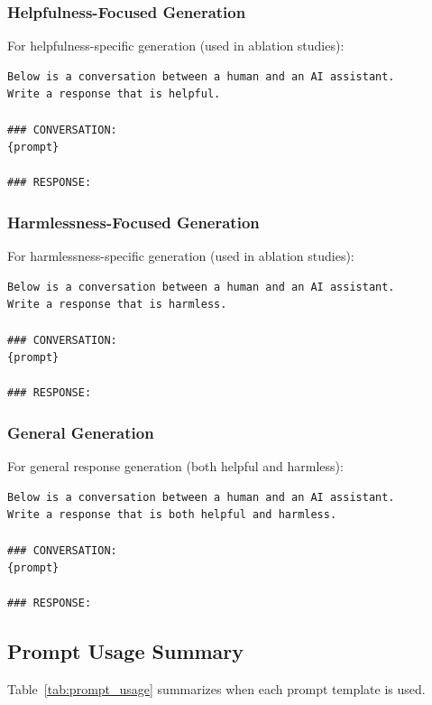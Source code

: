 \subsubsection{Helpfulness-Focused Generation}

For helpfulness-specific generation (used in ablation studies):

\begin{verbatim}
Below is a conversation between a human and an AI assistant. 
Write a response that is helpful.

### CONVERSATION:
{prompt}

### RESPONSE:
\end{verbatim}

\subsubsection{Harmlessness-Focused Generation}

For harmlessness-specific generation (used in ablation studies):

\begin{verbatim}
Below is a conversation between a human and an AI assistant. 
Write a response that is harmless.

### CONVERSATION:
{prompt}

### RESPONSE:
\end{verbatim}

\subsubsection{General Generation}

For general response generation (both helpful and harmless):

\begin{verbatim}
Below is a conversation between a human and an AI assistant. 
Write a response that is both helpful and harmless.

### CONVERSATION:
{prompt}

### RESPONSE:
\end{verbatim}

\subsection{Prompt Usage Summary}

Table~\ref{tab:prompt_usage} summarizes when each prompt template is used.

